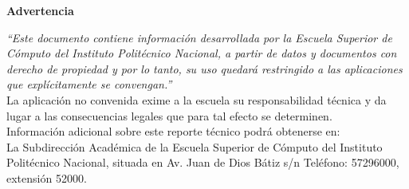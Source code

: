 \newpage
\vspace*{2cm}
\begin{center}
	\Large{\textbf{Advertencia}} \\[2cm]
	\normalsize
\end{center}
	\begin{mdframed}[style=MyFrame2] \vspace*{0.3cm}	\begin{mdframed}[style=MyFrame]
		\begin{center}
			\textit{``Este documento contiene información desarrollada por la Escuela Superior de Cómputo del Instituto Politécnico Nacional, a partir de datos y documentos con derecho de propiedad y por lo tanto, su uso quedará restringido a las aplicaciones que explícitamente se convengan.''}\\[1cm]
		La aplicación no convenida exime a la escuela su responsabilidad técnica y da lugar a las consecuencias legales que para tal efecto se determinen. \\
		Información adicional sobre este reporte técnico podrá obtenerse en:\\
		La Subdirección Académica de la Escuela Superior de Cómputo del Instituto Politécnico Nacional, situada en Av. Juan de Dios Bátiz s/n Teléfono: 57296000, extensión 52000. 
		\end{center}

\end{mdframed}\end{mdframed}
